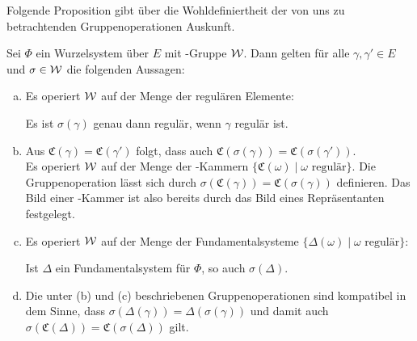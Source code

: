 Folgende Proposition gibt über die Wohldefiniertheit der von uns zu betrachtenden Gruppenoperationen Auskunft.

\begin{prop}
  \label{prop:groupOp}
  Sei $\Phi$ ein Wurzelsystem über $E$ mit \weyl\hyp{}Gruppe $\mathcal{W}$.
  Dann gelten für alle $\gamma, \gamma' \in E$ und $\sigma \in \mathcal{W}$ die folgenden Aussagen:
  \begin{enumerate}[(a)]
    \item Es operiert $\mathcal{W}$ auf der Menge der regulären Elemente: 
      \begin{addmargin}[2em]{2em}
        Es ist $\sigma(\gamma)$ genau dann regulär, wenn $\gamma$ regulär ist.
      \end{addmargin}
      
    \item Aus $\mathfrak{C}(\gamma) = \mathfrak{C}(\gamma')$ folgt, dass auch $\mathfrak{C}(\sigma(\gamma)) = \mathfrak{C}(\sigma(\gamma'))$. \\
      Es operiert $\mathcal{W}$ auf der Menge der \weyl\hyp{}Kammern $\{\mathfrak{C}(\omega) \mid \omega \text{ regulär}\}$. 
      Die Gruppenoperation lässt sich durch $ \sigma(\mathfrak{C}(\gamma)) = \mathfrak{C}(\sigma(\gamma))$ definieren.
      Das Bild einer \weyl\hyp{}Kammer ist also bereits durch das Bild eines Repräsentanten festgelegt.

    \item Es operiert $\mathcal{W}$ auf der Menge der Fundamentalsysteme $\{\Delta(\omega) \mid \omega \text{ regulär}\}$: 
      \begin{addmargin}[2em]{2em}
        Ist $\Delta$ ein Fundamentalsystem für $\Phi$, so auch $\sigma(\Delta)$. 
      \end{addmargin}

    \item Die unter (b) und (c) beschriebenen Gruppenoperationen sind kompatibel in dem Sinne, dass 
      $\sigma(\Delta(\gamma)) = \Delta(\sigma(\gamma))$
      und damit auch
      $\sigma(\mathfrak{C}(\Delta)) = \mathfrak{C}(\sigma(\Delta))$
      gilt.
  \end{enumerate}
\end{prop}

